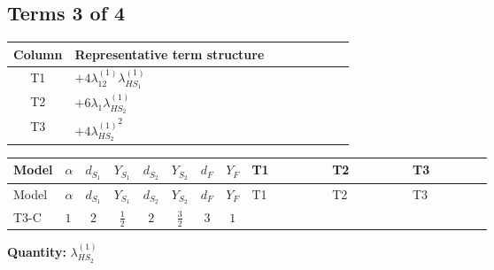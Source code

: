 \documentclass[8pt]{article}
\begin{document}
\begin{landscape}
\subsection*{Terms 3 of 4}
\begin{center}
\begin{tabular}{@{}c >{\raggedright\arraybackslash}p{0.82\linewidth}@{}}
\toprule
Column & Representative term structure \\
\midrule
T1 & \(\displaystyle +4 {\lambda_{12}^{(1)}} {\lambda_{HS_1}^{(1)}}\) \\
\midrule
T2 & \(\displaystyle +6 {\lambda_1} {\lambda_{HS_2}^{(1)}}\) \\
\midrule
T3 & \(\displaystyle +4 {\lambda_{HS_2}^{(1)}}^2\) \\
\midrule
\bottomrule
\end{tabular}
\end{center}
\smallskip
\tiny
\begin{longtable}{@{}llcccccc >{\raggedright\arraybackslash}p{0.21\linewidth} >{\raggedright\arraybackslash}p{0.21\linewidth} >{\raggedright\arraybackslash}p{0.21\linewidth}@{}}
\toprule
Model & $\alpha$ & $d_{S_1}$ & $Y_{S_1}$ & $d_{S_2}$ & $Y_{S_2}$ & $d_F$ & $Y_F$ & T1 & T2 & T3 \\
\midrule
\endfirsthead
\toprule
Model & $\alpha$ & $d_{S_1}$ & $Y_{S_1}$ & $d_{S_2}$ & $Y_{S_2}$ & $d_F$ & $Y_F$ & T1 & T2 & T3 \\
\midrule
\endhead
T3-C & $1$ & $2$ & $\frac{1}{2}$ & $2$ & $\frac{3}{2}$ & $3$ & $1$ & \scriptsize\adjustbox{max width=\linewidth}{$\begin{gathered} +4 {\lambda_{12}^{(1)}} {\lambda_{HS_1}^{(1)}}\end{gathered}$} & \scriptsize\adjustbox{max width=\linewidth}{$\begin{gathered} +6 {\lambda_1} {\lambda_{HS_2}^{(1)}}\end{gathered}$} & \scriptsize\adjustbox{max width=\linewidth}{$\begin{gathered} +4 {\lambda_{HS_2}^{(1)}}^2\end{gathered}$} \\
\midrule
\bottomrule
\end{longtable}
\clearpage
\noindent\textbf{Quantity: }$\lambda_{HS_2}^{(1)}$\par\smallskip

\end{landscape}
\end{document}
